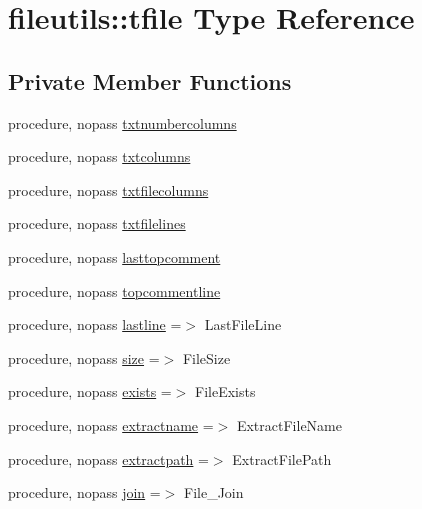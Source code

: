 \hypertarget{structfileutils_1_1tfile}{}\section{fileutils\+:\+:tfile Type Reference}
\label{structfileutils_1_1tfile}
\subsection*{Private Member Functions}
\begin{DoxyCompactItemize}
\item 
procedure, nopass \mbox{\hyperlink{structfileutils_1_1tfile_ae39f35cb46467e4f7c7b2a6333760ff4}{txtnumbercolumns}}
\item 
procedure, nopass \mbox{\hyperlink{structfileutils_1_1tfile_a3be117fe85987362f1fe7aadaf3b750d}{txtcolumns}}
\item 
procedure, nopass \mbox{\hyperlink{structfileutils_1_1tfile_a569e8eb7461473f94ed44e5299f9fa3d}{txtfilecolumns}}
\item 
procedure, nopass \mbox{\hyperlink{structfileutils_1_1tfile_ae6a4e80338d3c54f7af28d151e68f9fe}{txtfilelines}}
\item 
procedure, nopass \mbox{\hyperlink{structfileutils_1_1tfile_a621fb21fcb485d4fd6dcc5ce5c245f85}{lasttopcomment}}
\item 
procedure, nopass \mbox{\hyperlink{structfileutils_1_1tfile_a6f71b4071c45a6d9a4b170673e57d07d}{topcommentline}}
\item 
procedure, nopass \mbox{\hyperlink{structfileutils_1_1tfile_ad7676132630777125603739ea5216529}{lastline}} =$>$ Last\+File\+Line
\item 
procedure, nopass \mbox{\hyperlink{structfileutils_1_1tfile_ab109150a80fd9a3e7e9891127698d592}{size}} =$>$ File\+Size
\item 
procedure, nopass \mbox{\hyperlink{structfileutils_1_1tfile_a3a61370299b77e0cc2f5b529b58e2dcd}{exists}} =$>$ File\+Exists
\item 
procedure, nopass \mbox{\hyperlink{structfileutils_1_1tfile_a28563a736ee9c0cc8275fc84ee4b731a}{extractname}} =$>$ Extract\+File\+Name
\item 
procedure, nopass \mbox{\hyperlink{structfileutils_1_1tfile_a2894e82403ee6883defa2760cc1daf6a}{extractpath}} =$>$ Extract\+File\+Path
\item 
procedure, nopass \mbox{\hyperlink{structfileutils_1_1tfile_ac01b0b35e4d84655a6ac1bcfca2b3897}{join}} =$>$ File\+\_\+\+Join
\item 

\end{DoxyCompactItemize}
